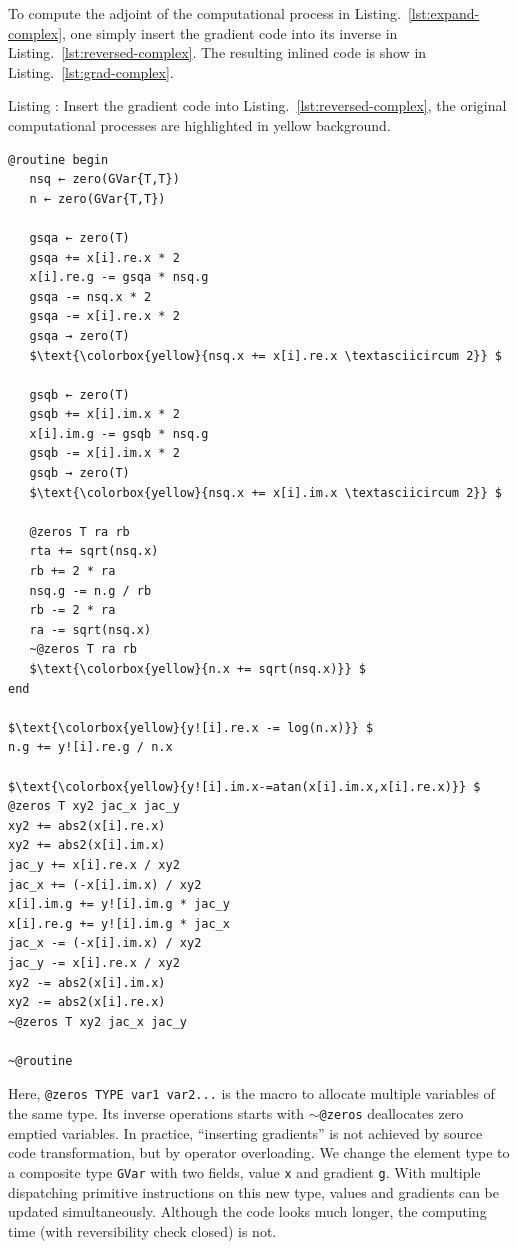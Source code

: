 \documentclass{article}
\newcommand{\listingcaption}[1]%
{%
\refstepcounter{lstlisting}\hfill%
Listing \thelstlisting: #1\hfill%
}%
\newcommand{\<}{\langle}
\renewcommand{\>}{\rangle}
\newcommand{\Lst}[1]{Listing.~\ref{#1}}
\theoremstyle{definition}\newtheorem{definition}{\textit{Definition}}
\begin{document}
To compute the adjoint of the computational process in \Lst{lst:expand-complex}, one simply insert the gradient code into its inverse in \Lst{lst:reversed-complex}.
The resulting inlined code is show in \Lst{lst:grad-complex}.

\begin{minipage}{.88\columnwidth}
\listingcaption{Insert the gradient code into \Lst{lst:reversed-complex}, the original computational processes are highlighted in yellow background.}\label{lst:grad-complex}
\begin{lstlisting}[mathescape=true,label={lst:grad-complex}, multicols=2]
@routine begin
   nsq ← zero(GVar{T,T})
   n ← zero(GVar{T,T})

   gsqa ← zero(T)
   gsqa += x[i].re.x * 2
   x[i].re.g -= gsqa * nsq.g
   gsqa -= nsq.x * 2
   gsqa -= x[i].re.x * 2
   gsqa → zero(T)
   $\text{\colorbox{yellow}{nsq.x += x[i].re.x \textasciicircum 2}} $

   gsqb ← zero(T)
   gsqb += x[i].im.x * 2
   x[i].im.g -= gsqb * nsq.g
   gsqb -= x[i].im.x * 2
   gsqb → zero(T)
   $\text{\colorbox{yellow}{nsq.x += x[i].im.x \textasciicircum 2}} $

   @zeros T ra rb
   rta += sqrt(nsq.x)
   rb += 2 * ra
   nsq.g -= n.g / rb
   rb -= 2 * ra
   ra -= sqrt(nsq.x)
   ~@zeros T ra rb
   $\text{\colorbox{yellow}{n.x += sqrt(nsq.x)}} $
end

$\text{\colorbox{yellow}{y![i].re.x -= log(n.x)}} $
n.g += y![i].re.g / n.x

$\text{\colorbox{yellow}{y![i].im.x-=atan(x[i].im.x,x[i].re.x)}} $
@zeros T xy2 jac_x jac_y
xy2 += abs2(x[i].re.x)
xy2 += abs2(x[i].im.x)
jac_y += x[i].re.x / xy2
jac_x += (-x[i].im.x) / xy2
x[i].im.g += y![i].im.g * jac_y
x[i].re.g += y![i].im.g * jac_x
jac_x -= (-x[i].im.x) / xy2
jac_y -= x[i].re.x / xy2
xy2 -= abs2(x[i].im.x)
xy2 -= abs2(x[i].re.x)
~@zeros T xy2 jac_x jac_y

~@routine
\end{lstlisting}
\end{minipage}

Here, \texttt{@zeros TYPE var1 var2...} is the macro to allocate multiple variables of the same type. Its inverse operations starts with \texttt{$\sim$@zeros} deallocates zero emptied variables.
In practice, ``inserting gradients'' is not achieved by source code transformation, but by operator overloading. We change the element type to a composite type \texttt{GVar} with two fields, value \texttt{x} and gradient \texttt{g}.
With multiple dispatching primitive instructions on this new type, values and gradients can be updated simultaneously.
Although the code looks much longer, the computing time (with reversibility check closed) is not.
\end{document}
